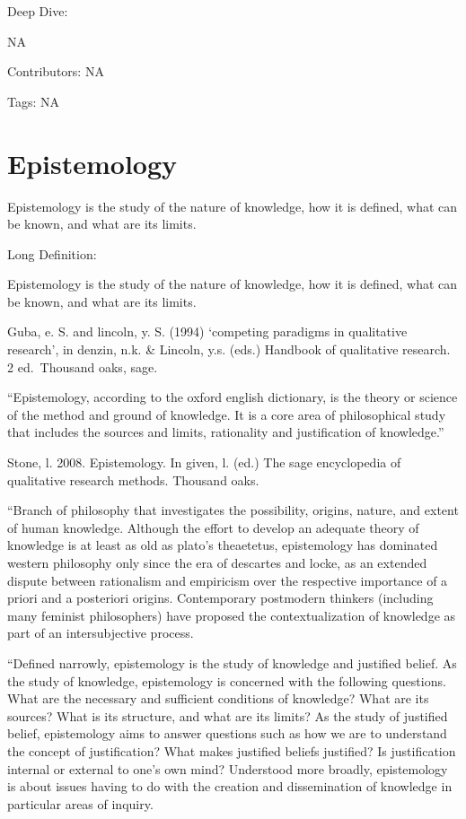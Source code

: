 \documentclass[
  letterpaper,
  DIV=11,
  numbers=noendperiod]{scrreprt}
\begin{document}
Deep Dive:

NA

Contributors: NA

Tags: NA

\section{Epistemology}\label{epistemology}

Epistemology is the study of the nature of knowledge, how it is defined,
what can be known, and what are its limits.

Long Definition:

Epistemology is the study of the nature of knowledge, how it is defined,
what can be known, and what are its limits.

Guba, e. S. and lincoln, y. S. (1994) `competing paradigms in
qualitative research', in denzin, n.k. \& Lincoln, y.s. (eds.) Handbook
of qualitative research. 2 ed.~Thousand oaks, sage.

``Epistemology, according to the oxford english dictionary, is the
theory or science of the method and ground of knowledge. It is a core
area of philosophical study that includes the sources and limits,
rationality and justification of knowledge.''

Stone, l. 2008. Epistemology. In given, l. (ed.) The sage encyclopedia
of qualitative research methods. Thousand oaks.

``Branch of philosophy that investigates the possibility, origins,
nature, and extent of human knowledge. Although the effort to develop an
adequate theory of knowledge is at least as old as plato's theaetetus,
epistemology has dominated western philosophy only since the era of
descartes and locke, as an extended dispute between rationalism and
empiricism over the respective importance of a priori and a posteriori
origins. Contemporary postmodern thinkers (including many feminist
philosophers) have proposed the contextualization of knowledge as part
of an intersubjective process.

``Defined narrowly, epistemology is the study of knowledge and justified
belief. As the study of knowledge, epistemology is concerned with the
following questions. What are the necessary and sufficient conditions of
knowledge? What are its sources? What is its structure, and what are its
limits? As the study of justified belief, epistemology aims to answer
questions such as how we are to understand the concept of justification?
What makes justified beliefs justified? Is justification internal or
external to one's own mind? Understood more broadly, epistemology is
about issues having to do with the creation and dissemination of
knowledge in particular areas of inquiry.
\end{document}
